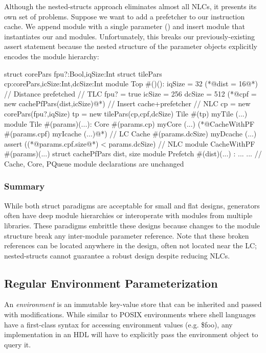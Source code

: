 Although the nested-structs approach eliminates almost all NLCs, it presents its own set of problems. 
Suppose we want to add a prefetcher to our instruction cache. 
We append module  with a single parameter () and insert module  that instantiates our  and  modules. 
Unfortunately, this breaks our previously-existing assert statement because the nested structure of the parameter objects explicitly encodes the module hierarchy:

\begin{phdl}
struct corePars {fpu?:Bool,iqSize:Int}
struct tilePars {cp:corePars,icSize:Int,dcSize:Int}
module Top #()():
  iqSize = 32
  (*@\textcolor[rgb]{1,0,0}{dist = 16}@*)    // Distance prefetched                            // TLC
  fpu? = true
  icSize = 256
  dcSize = 512
  (*@\textcolor[rgb]{1,0,0}{cpf = new cachePfPars(dist,icSize)}@*) // Insert cache+prefetcher  // NLC
  cp = new corePars(fpu?,iqSize)
  tp = new tilePars(cp,cpf,dcSize)
  Tile #(tp) myTile (...)
module Tile #(params)(...):
  Core  #(params.cp)  myCore   (...)
  (*@\textcolor[rgb]{1,0,0}{CacheWithPF \#(params.cpf) myIcache (...)}@*)                       // LC
  Cache #(params.dcSize) myDcache (...)
  assert ((*@\textcolor[rgb]{1,0,0}{params.cpf.size}@*) < params.dcSize)                       // NLC
module CacheWithPF #(params)(...)
struct cachePfPars {dist, size}
module Prefetch #(dist)(...) : ...
... // Cache, Core, PQueue module declarations are unchanged
\end{phdl} 

\subsubsection{Summary}

While both struct paradigms are acceptable for small and flat designs, generators often have deep module hierarchies or interoperate with modules from multiple libraries. 
These paradigms embrittle these designs because changes to the module structure break any inter-module parameter reference. 
Note that these broken references can be located anywhere in the design, often not located near the LC; nested-structs cannot guarantee a robust design despite reducing NLCs.

\subsection{Regular Environment Parameterization}
An \emph{environment} is an immutable key-value store that can be inherited and passed with modifications. While similar to POSIX environments where shell languages have a first-class syntax for accessing environment values (e.g. \$foo), any implementation in an HDL will have to explicitly pass the environment object to query it.

